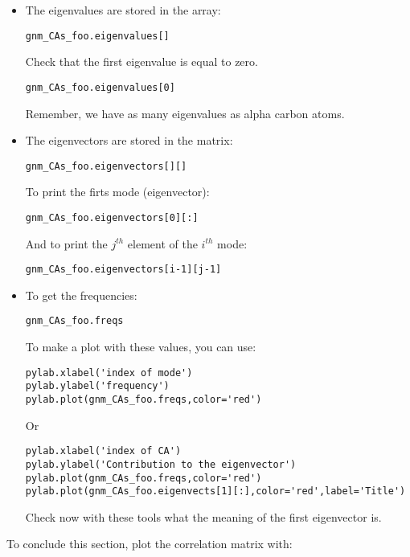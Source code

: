 \documentclass[12pt]{article}
\begin{document}
\begin{itemize}
\item The eigenvalues are stored in the array:
\begin{verbatim}
gnm_CAs_foo.eigenvalues[]
\end{verbatim}
Check that the first eigenvalue is equal to zero.

\begin{verbatim}
gnm_CAs_foo.eigenvalues[0]
\end{verbatim}

Remember, we have as many eigenvalues as alpha carbon atoms.

\item The eigenvectors are stored in the matrix:
\begin{verbatim}
gnm_CAs_foo.eigenvectors[][]
\end{verbatim}

To print the firts mode (eigenvector):
\begin{verbatim}
gnm_CAs_foo.eigenvectors[0][:]
\end{verbatim}

And to print the $j^{th}$ element of the $i^{th}$ mode:
\begin{verbatim}
gnm_CAs_foo.eigenvectors[i-1][j-1]
\end{verbatim}

\item To get the frequencies:
\begin{verbatim}
gnm_CAs_foo.freqs
\end{verbatim}

To make a plot with these values, you can use:

\begin{verbatim}
pylab.xlabel('index of mode')
pylab.ylabel('frequency')
pylab.plot(gnm_CAs_foo.freqs,color='red')
\end{verbatim}

Or

\begin{verbatim}
pylab.xlabel('index of CA')
pylab.ylabel('Contribution to the eigenvector')
pylab.plot(gnm_CAs_foo.freqs,color='red')
pylab.plot(gnm_CAs_foo.eigenvects[1][:],color='red',label='Title')
\end{verbatim}

Check now with these tools what the meaning of the first eigenvector is.
\end{itemize}

To conclude this section, plot the correlation matrix with:
\end{document}

